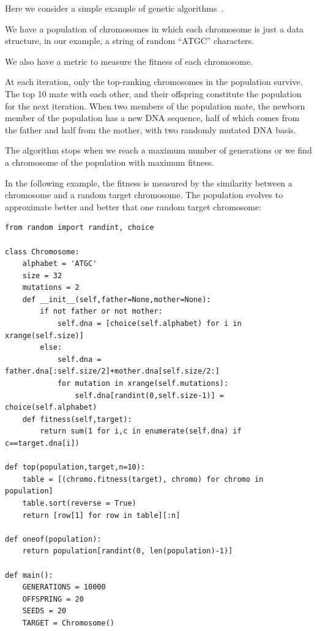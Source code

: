 \documentclass[justified,sixbynine]{tufte-book}
\theoremstyle{plain}%
\theoremstyle{definition}
\theoremstyle{remark}
\begin{document}
\begin{fullwidth}

Here we consider a simple example of genetic algorithms~\cite{barricelli}.

We have a population of chromosomes in which each chromosome is just a data structure, in our example, a string of random ``ATGC'' characters.

We also have a metric to measure the fitness of each chromosome.

At each iteration, only the top-ranking chromosomes in the population survive. The top 10 mate with each other, and their offspring constitute the population for the next iteration. When two members of the population mate, the newborn member of the population has a new DNA sequence, half of which comes from the father and half from the mother, with two randomly mutated DNA basis.

The algorithm stops when we reach a maximum number of generations or we find a chromosome of the population with maximum fitness.

In the following example, the fitness is measured by the similarity between a chromosome and a random target chromosome. The population evolves to approximate better and better that one random target chromosome:


\begin{lstlisting}
from random import randint, choice

class Chromosome:
    alphabet = 'ATGC'
    size = 32
    mutations = 2
    def __init__(self,father=None,mother=None):
        if not father or not mother:
            self.dna = [choice(self.alphabet) for i in xrange(self.size)]
        else:
            self.dna = father.dna[:self.size/2]+mother.dna[self.size/2:]
            for mutation in xrange(self.mutations):
                self.dna[randint(0,self.size-1)] = choice(self.alphabet)
    def fitness(self,target):
        return sum(1 for i,c in enumerate(self.dna) if c==target.dna[i])

def top(population,target,n=10):
    table = [(chromo.fitness(target), chromo) for chromo in population]
    table.sort(reverse = True)
    return [row[1] for row in table][:n]

def oneof(population):
    return population[randint(0, len(population)-1)]

def main():
    GENERATIONS = 10000
    OFFSPRING = 20
    SEEDS = 20
    TARGET = Chromosome()


\end{lstlisting}
\end{fullwidth}
\end{document}
